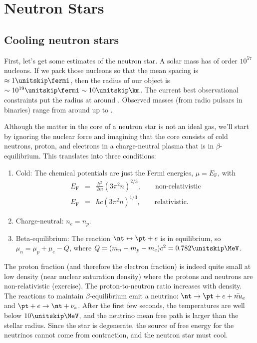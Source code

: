 \chapter{Neutron Stars}

\section{Cooling neutron stars}\label{s.cooling-neutron-stars}
First, let's get some estimates of the neutron star.  A solar mass has of order $10^{57}$ nucleons.  If we pack those nucleons so that the mean spacing is $\approx 1\nsp\fermi$, then the radius of our object is $\sim 10^{19}\nsp\fermi\sim 10\nsp\km$.  The current best observational constraints put the radius at around .  Observed masses (from radio pulsars in binaries) range from around  up to .

Although the matter in the core of a neutron star is not an ideal gas, we'll start by ignoring the nuclear force and imagining that the core consists of cold  neutrons, proton, and electrons in a charge-neutral plasma that is in $\beta$-equilibrium. This translates into three conditions:
\begin{enumerate}
\item\label{cold-neutron-star} Cold: The chemical potentials are just the Fermi energies, $\mu = E_{\mathrm{F}}$, with
\begin{eqnarray}
	E_{\mathrm{F}} &=& \frac{\hbar^{2}}{2m}\left(3\pi^{2}n\right)^{2/3},\qquad\textrm{non-relativistic}\\
	E_{\mathrm{F}} &=& \hbar c\left(3\pi^{2}n\right)^{1/3},\qquad\textrm{relativistic}.
\end{eqnarray}
\item\label{charge-neutral-star} Charge-neutral: $n_{e} = n_{p}$.
\item\label{beta-equil-star} Beta-equilibrium: The reaction $\nt\leftrightarrow \pt+e$ is in equilibrium, so 
$ \mu_{n} = \mu_{p}+\mu_{e} - Q$,
where $Q = (m_{n}-m_{p}-m_{e})c^{2} = 0.782\nsp\MeV$.
\end{enumerate}

The proton fraction (and therefore the electron fraction) is indeed quite small at low density (near nuclear saturation density) where the protons and neutrons are non-relativistic (exercise).  The proton-to-neutron ratio increases with density.  The reactions to maintain $\beta$-equilibrium emit a neutrino: $\nt \to \pt + e + \bar{nu}_{e}$ and $\pt + e \to \nt + \nu_{e}$.  After the first few seconds, the temperatures are well below $10\nsp\MeV$, and the neutrino mean free path is larger than the stellar radius.  Since the star is degenerate, the source of free energy for the neutrinos cannot come from contraction, and the neutron star must cool.

